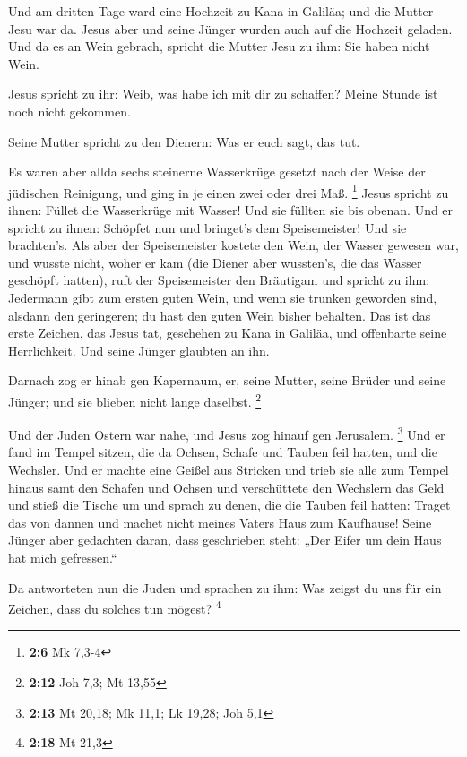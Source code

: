  Und am dritten Tage ward eine Hochzeit zu Kana in
Galiläa; und die Mutter Jesu war da.  Jesus aber und seine
Jünger wurden auch auf die Hochzeit geladen.  Und da es an
Wein gebrach, spricht die Mutter Jesu zu ihm: Sie haben nicht Wein.

 Jesus spricht zu ihr: Weib, was habe ich mit dir zu
schaffen? Meine Stunde ist noch nicht gekommen.

 Seine Mutter spricht zu den Dienern: Was er euch sagt,
das tut.

 Es waren aber allda sechs steinerne Wasserkrüge gesetzt
nach der Weise der jüdischen Reinigung, und ging in je einen zwei oder
drei Maß. \footnote{\textbf{2:6} Mk 7,3-4}  Jesus spricht
zu ihnen: Füllet die Wasserkrüge mit Wasser! Und sie füllten sie bis
obenan.  Und er spricht zu ihnen: Schöpfet nun und
bringet's dem Speisemeister! Und sie brachten's.  Als aber
der Speisemeister kostete den Wein, der Wasser gewesen war, und wusste
nicht, woher er kam (die Diener aber wussten's, die das Wasser geschöpft
hatten), ruft der Speisemeister den Bräutigam  und
spricht zu ihm: Jedermann gibt zum ersten guten Wein, und wenn sie
trunken geworden sind, alsdann den geringeren; du hast den guten Wein
bisher behalten.  Das ist das erste Zeichen, das Jesus
tat, geschehen zu Kana in Galiläa, und offenbarte seine Herrlichkeit.
Und seine Jünger glaubten an ihn.

 Darnach zog er hinab gen Kapernaum, er, seine Mutter,
seine Brüder und seine Jünger; und sie blieben nicht lange daselbst.
\footnote{\textbf{2:12} Joh 7,3; Mt 13,55}

 Und der Juden Ostern war nahe, und Jesus zog hinauf gen
Jerusalem. \footnote{\textbf{2:13} Mt 20,18; Mk 11,1; Lk 19,28; Joh 5,1}
 Und er fand im Tempel sitzen, die da Ochsen, Schafe und
Tauben feil hatten, und die Wechsler.  Und er machte eine
Geißel aus Stricken und trieb sie alle zum Tempel hinaus samt den
Schafen und Ochsen und verschüttete den Wechslern das Geld und stieß die
Tische um  und sprach zu denen, die die Tauben feil
hatten: Traget das von dannen und machet nicht meines Vaters Haus zum
Kaufhause!  Seine Jünger aber gedachten daran, dass
geschrieben steht: „Der Eifer um dein Haus hat mich gefressen.``

 Da antworteten nun die Juden und sprachen zu ihm: Was
zeigst du uns für ein Zeichen, dass du solches tun mögest? \footnote{\textbf{2:18}
  Mt 21,3}

